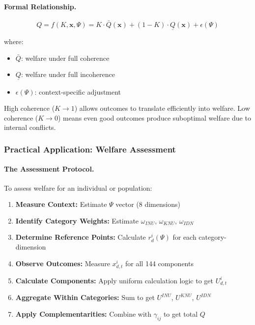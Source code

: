 \paragraph{Formal Relationship.}
\begin{equation}
Q = f(K, \mathbf{x}, \Psi) = K \cdot \bar{Q}(\mathbf{x}) + (1-K) \cdot \underline{Q}(\mathbf{x}) + \epsilon(\Psi)
\end{equation}

where:
\begin{itemize}
\item $\bar{Q}$: welfare under full coherence
\item $\underline{Q}$: welfare under full incoherence
\item $\epsilon(\Psi)$: context-specific adjustment
\end{itemize}

High coherence ($K \rightarrow 1$) allows outcomes to translate efficiently 
into welfare. Low coherence ($K \rightarrow 0$) means even good outcomes 
produce suboptimal welfare due to internal conflicts.

\subsubsection{Practical Application: Welfare Assessment}

\paragraph{The Assessment Protocol.}
To assess welfare for an individual or population:

\begin{enumerate}
\item \textbf{Measure Context:} Estimate $\Psi$ vector (8 dimensions)
\item \textbf{Identify Category Weights:} Estimate $\omega_{INU}$, $\omega_{KNU}$, $\omega_{IDN}$
\item \textbf{Determine Reference Points:} Calculate $r^i_d(\Psi)$ for each category-dimension
\item \textbf{Observe Outcomes:} Measure $x^i_{d,t}$ for all 144 components
\item \textbf{Calculate Components:} Apply uniform calculation logic to get $U^i_{d,t}$
\item \textbf{Aggregate Within Categories:} Sum to get $U^{INU}$, $U^{KNU}$, $U^{IDN}$
\item \textbf{Apply Complementarities:} Combine with $\gamma_{ij}$ to get total $Q$
\end{enumerate}

